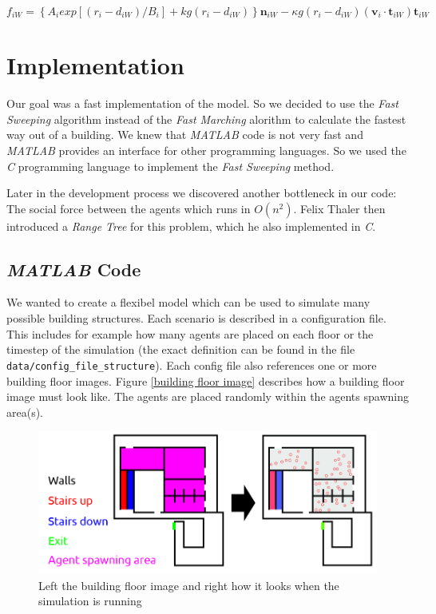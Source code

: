 \documentclass[11pt]{article}
\begin{document}
\begin{equation}
f_{iW}=\left\{A_{i}exp[(r_{i}-d_{iW})/B_{i}]+kg(r_{i}-d_{iW})\right\}\mathbf{n}_{iW}-\kappa g(r_{i}-d_{iW})(\mathbf{v}_{i}\cdot\mathbf{t}_{iW})\mathbf{t}_{iW}
\end{equation}

\section{Implementation}\label{implementation}
Our goal was a fast implementation of the model. So we decided to use the
\textit{Fast Sweeping} algorithm instead of the \textit{Fast Marching} alorithm
to calculate the fastest way out of a building. We knew that \textit{MATLAB}
code is not very fast and \textit{MATLAB} provides an interface for other
programming languages. So we used the \textit{C} programming language to
implement the \textit{Fast Sweeping} method.

Later in the development process we discovered another bottleneck in our code:
The social force between the agents which runs in $ O(n^2) $. Felix Thaler then
introduced a \textit{Range Tree} for this problem, which he also implemented in
\textit{C}.


\subsection{\textit{MATLAB} Code} \label{matlab code}
We wanted to create a flexibel model which can be used to simulate many
possible building structures.
Each scenario is described in a configuration file. This includes for example how many
agents are placed on each floor or the timestep of the simulation (the exact
definition can be found in the file \verb+data/config_file_structure+). Each config
file also references one or more building floor images.
Figure \vref{building floor image} describes how a building floor
image must look like. The agents are placed randomly within the agents spawning
area(s).

\begin{figure}[ht]
\centering
\includegraphics[width=\textwidth]{./images/config_floor_description.png}
\caption{Left the building floor image and right how it looks when the
simulation is running} 
\label{building floor image}
\end{figure}
\end{document}
